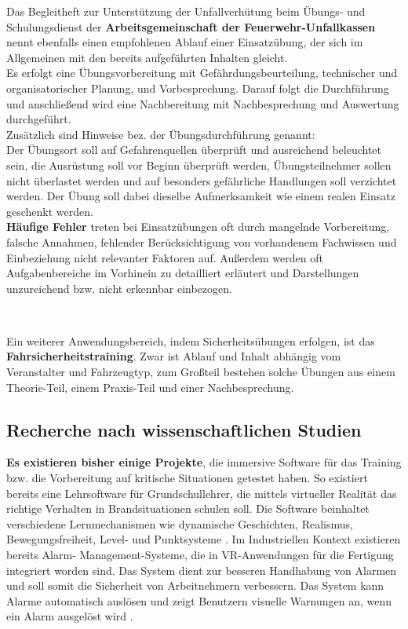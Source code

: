 Das Begleitheft zur Unterstützung der Unfallverhütung beim Übungs- und Schulungsdienst der \textbf{Arbeitsgemeinschaft der Feuerwehr-Unfallkassen} \autocite{Feuerweh-Unfallkasse} nennt ebenfalls einen empfohlenen Ablauf einer Einsatzübung, der sich im Allgemeinen mit den bereits aufgeführten Inhalten gleicht. \\
Es erfolgt eine Übungsvorbereitung mit Gefährdungsbeurteilung, technischer und organisatorischer Planung, und Vorbesprechung. Darauf folgt die Durchführung und anschließend wird eine Nachbereitung mit Nachbesprechung und Auswertung durchgeführt. \\ 
Zusätzlich sind Hinweise bez. der Übungsdurchführung genannt: \\
Der Übungsort soll auf Gefahrenquellen überprüft und ausreichend beleuchtet sein, die Ausrüstung soll vor Beginn überprüft werden, Übungsteilnehmer sollen nicht überlastet werden und auf besonders gefährliche Handlungen soll verzichtet werden. Der Übung soll dabei dieselbe Aufmerksamkeit wie einem realen Einsatz geschenkt werden. \\
\textbf{Häufige Fehler} treten bei Einsatzübungen oft durch mangelnde Vorbereitung, falsche Annahmen, fehlender Berücksichtigung von vorhandenem Fachwissen und Einbeziehung nicht relevanter Faktoren auf. Außerdem werden oft Aufgabenbereiche im Vorhinein zu detailliert erläutert und Darstellungen unzureichend bzw. nicht erkennbar einbezogen. \autocite{Feuerweh-Übungspräsentation}

\ 

Ein weiterer Anwendungsbereich, indem Sicherheitsübungen erfolgen, ist das \textbf{Fahrsicherheitstraining}. Zwar ist Ablauf und Inhalt abhängig vom Veranstalter und Fahrzeugtyp, zum Großteil bestehen solche Übungen aus einem Theorie-Teil, einem Praxis-Teil und einer Nachbesprechung. \autocite{DVR}

\newpage
\subsection{Recherche nach wissenschaftlichen Studien}

\textbf{Es existieren bisher einige Projekte}, die immersive Software für das Training bzw. die Vorbereitung auf kritische Situationen getestet haben. So existiert bereits eine Lehrsoftware für Grundschullehrer, die mittels virtueller Realität das richtige Verhalten in Brandsituationen schulen soll. Die Software beinhaltet verschiedene Lernmechanismen wie dynamische Geschichten, Realismus, Bewegungsfreiheit, Level- und Punktsysteme \autocite{DDE_of_VR}. Im Industriellen Kontext existieren bereits Alarm- Management-Systeme, die in VR-Anwendungen für die Fertigung integriert worden sind. Das System dient zur besseren Handhabung von Alarmen und soll somit die Sicherheit von Arbeitnehmern verbessern. Das System kann Alarme automatisch auslösen und zeigt Benutzern visuelle Warnungen an, wenn ein Alarm ausgelöst wird \autocite{Design_of_VR-training}.

